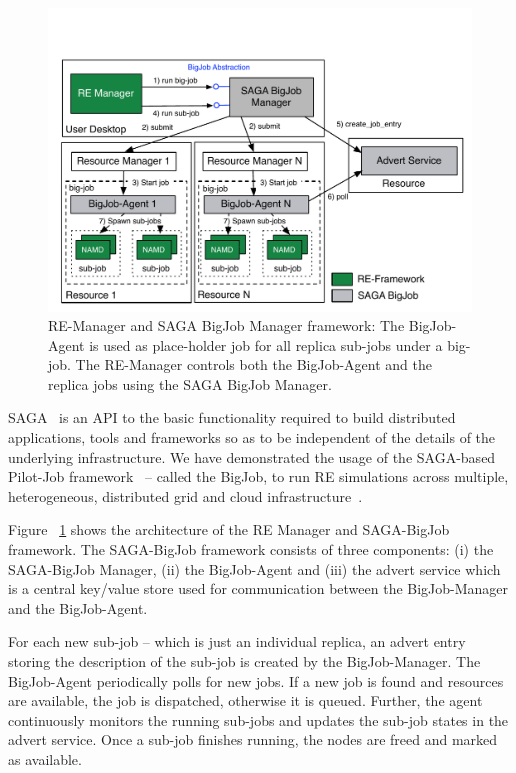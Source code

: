 \documentclass{rspublic}
\newcommand{\athotanote}[1]{ {\textcolor{green} { ***athota: #1 }}}
\newcommand{\athotanote}[1]{}
\begin{document}
\begin{figure}[t]
      \centering
          \includegraphics[scale=0.45]{../figures/Bigjob_arch.pdf}
          \caption{\footnotesize RE-Manager and SAGA BigJob Manager
            framework: The BigJob-Agent is used as place-holder job
            for all replica sub-jobs under a big-job. The RE-Manager
            controls both the BigJob-Agent and the replica jobs using
            the SAGA BigJob Manager.  }
      \label{fig:bigjob}
\end{figure}

SAGA~\citep{saga-url} %
is an API to the basic functionality required to build distributed
applications, tools and frameworks so as to be independent of the
details of the underlying infrastructure.  We have demonstrated the
usage of the SAGA-based Pilot-Job
framework~\citep{saga_bigjob_condor_cloud} -- called the BigJob, to
run RE simulations across multiple, heterogeneous, distributed grid
and cloud infrastructure~\citep{Luckow:2008fp}. 


Figure ~\ref{fig:bigjob} shows the architecture of the RE Manager and
SAGA-BigJob framework. The SAGA-BigJob framework consists of three
components: (i) the SAGA-BigJob Manager, (ii) the BigJob-Agent and
(iii) the advert service which is a central key/value store used for
communication between the BigJob-Manager and the BigJob-Agent.

For each new sub-job -- which is just an individual replica, an advert
entry storing the description of the sub-job is created by the
BigJob-Manager. The BigJob-Agent periodically polls for new jobs. If a
new job is found and resources are available, the job is dispatched,
otherwise it is queued.  Further, the agent continuously monitors the
running sub-jobs and updates the sub-job states in the advert
service. Once a sub-job finishes running, the nodes are freed and
marked as available.
\end{document}

